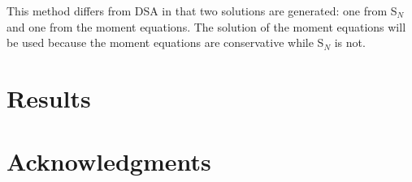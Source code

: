 \documentclass{anstrans}
\newcommand{\SN}{S$_N$\xspace}
\begin{document}
	This method differs from DSA in that two solutions are generated: one from \SN and one from the moment equations. The solution of the moment equations will be used because the moment equations are conservative while \SN is not. 
\section{Results}

\section{Acknowledgments}



\end{document}
